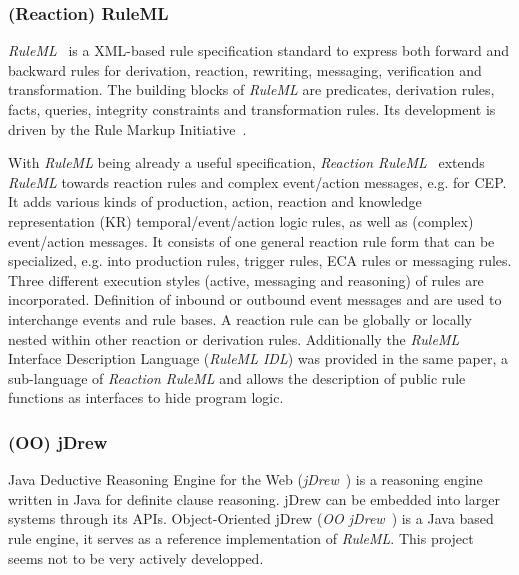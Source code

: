 \documentclass[11pt]{article}%
\begin{document}


\subsubsection{(Reaction) RuleML}
\textit{RuleML}~\cite{2006-Boley-RuleML.pdf} is a XML-based rule specification standard to express both forward and backward rules for derivation, reaction, rewriting, messaging, verification and transformation. The building blocks of \textit{RuleML} are predicates, derivation rules, facts, queries, integrity constraints and transformation rules. Its development is driven by the Rule Markup Initiative~\cite{wwwruleml}.

With \textit{RuleML} being already a useful specification, \textit{Reaction RuleML}~\cite{2012-Paschke_etal-ReactionRuleML.pdf} extends \textit{RuleML} towards reaction rules and complex event/action messages, e.g. for CEP. It adds various kinds of production, action, reaction and knowledge representation (KR) temporal/event/action logic rules, as well as (complex) event/action messages. It consists of one general reaction rule form that can be specialized, e.g. into production rules, trigger rules, ECA rules or messaging rules. Three different execution styles (active, messaging and reasoning) of rules are incorporated. Definition of inbound or outbound event messages and are used to interchange events and rule bases. A reaction rule can be globally or locally nested within other reaction or derivation rules. Additionally the \emph{RuleML} Interface Description Language (\textit{RuleML IDL}) was provided in the same paper, a sub-language of \textit{Reaction RuleML} and allows the description of public rule functions as interfaces to hide program logic.

\subsubsection{(OO) jDrew}
Java Deductive Reasoning Engine for the Web (\emph{jDrew}~\cite{wwwjdrew}) is a reasoning engine written in Java for definite clause reasoning. jDrew can be embedded into larger systems through its APIs.
Object-Oriented jDrew (\emph{OO jDrew}~\cite{2005-Ball_etal-OOjDrew.pdf,wwwoojdrew}) is a Java based rule engine, it serves as a reference implementation of \emph{RuleML}. This project seems not to be very actively developped.
\end{document}
